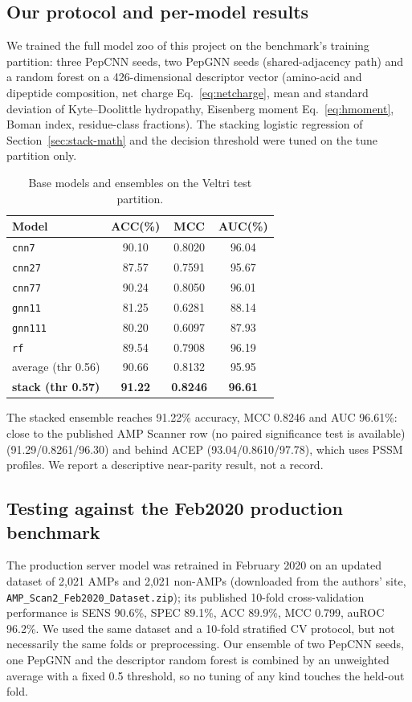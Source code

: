 \subsection{Our protocol and per-model results}
We trained the full model zoo of this project on the benchmark's training
partition: three PepCNN seeds, two PepGNN seeds (shared-adjacency path) and
a random forest on a 426-dimensional descriptor vector (amino-acid and
dipeptide composition, net charge Eq.~\eqref{eq:netcharge}, mean and
standard deviation of Kyte--Doolittle hydropathy, Eisenberg moment
Eq.~\eqref{eq:hmoment}, Boman index, residue-class fractions). The stacking
logistic regression of Section~\ref{sec:stack-math} and the decision
threshold were tuned on the tune partition only.

\begin{table}[h]\centering\small
\caption{Base models and ensembles on the Veltri test partition.}
\label{tab:veltri-ours}
\begin{tabular}{lccc}
\hline
Model & ACC(\%) & MCC & AUC(\%) \\
\hline
\texttt{cnn7} & 90.10 & 0.8020 & 96.04 \\
\texttt{cnn27} & 87.57 & 0.7591 & 95.67 \\
\texttt{cnn77} & 90.24 & 0.8050 & 96.01 \\
\texttt{gnn11} & 81.25 & 0.6281 & 88.14 \\
\texttt{gnn111} & 80.20 & 0.6097 & 87.93 \\
\texttt{rf} & 89.54 & 0.7908 & 96.19 \\
average (thr 0.56) & 90.66 & 0.8132 & 95.95 \\
\textbf{stack (thr 0.57)} & \textbf{91.22} & \textbf{0.8246} & \textbf{96.61} \\
\hline
\end{tabular}
\end{table}

The stacked ensemble reaches 91.22\% accuracy, MCC 0.8246 and AUC 96.61\%:
close to the published AMP Scanner row (no paired significance test is available)
(91.29/0.8261/96.30) and behind ACEP (93.04/0.8610/97.78), which uses PSSM profiles. We
report a descriptive near-parity result, not a record.

\subsection{Testing against the Feb2020 production benchmark}
The production server model was retrained in February 2020 on an updated
dataset of 2{,}021 AMPs and 2{,}021 non-AMPs (downloaded from the authors'
site, \texttt{AMP\_Scan2\_Feb2020\_Dataset.zip}); its published 10-fold
cross-validation performance is SENS 90.6\%, SPEC 89.1\%, ACC 89.9\%, MCC
0.799, auROC 96.2\%. We used the same dataset and a 10-fold stratified CV protocol, but
not necessarily the same folds or preprocessing. Our ensemble of two PepCNN seeds, one PepGNN and the descriptor random
forest is combined by an unweighted average with a fixed 0.5 threshold, so no
tuning of any kind touches the held-out fold.

